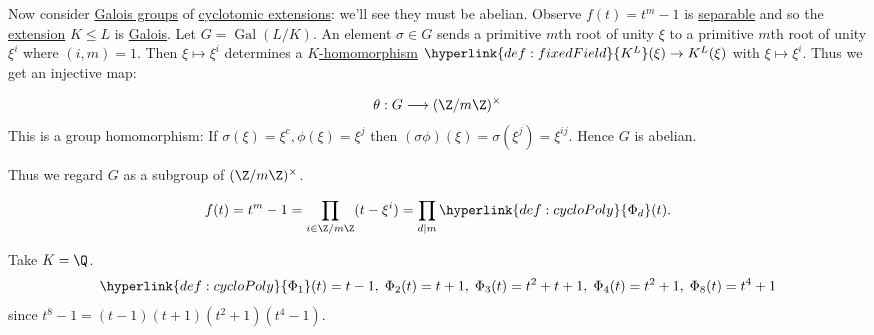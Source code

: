 \documentclass{article}
\DeclareMathOperator{\Gal}{Gal}
\begin{document}
Now consider \hyperlink{def:galoisGroup}{Galois groups} of \hyperlink{def:cycloExt}{cyclotomic extensions}: we'll see they must be abelian.
Observe $f(t) = t^m - 1$ is \hyperlink{def:separablePoly}{separable} and so the \hyperlink{def:fieldExt}{extension} $K \leq L$ is \hyperlink{def:galoisExt}{Galois}.
Let $G = \Gal(L/K)$.
An element $\sigma \in G$ sends a primitive $m$th root of unity $\xi$ to a primitive $m$th root of unity $\xi^i$ where $(i, m) = 1$.
Then $\xi \mapsto \xi^i$ determines a \hyperlink{def:homo}{$K$-homomorphism} $\hyperlink{def:fixedField}{K^L}(\xi) \to K^L(\xi)$ with $\xi \mapsto \xi^i$.
Thus we get an injective map:
\begin{ndef}\label{def:4.3}
    \begin{equation*}
        \theta: G \longrightarrow (\Z/m\Z)^\times
    \end{equation*}
    This is a group homomorphism:
    If $\sigma(\xi) = \xi^c, \phi(\xi) = \xi^j$ then $(\sigma\phi)(\xi) = \sigma(\xi^j) = \xi^{ij}$.
    Hence $G$ is abelian.

    Thus we regard $G$ as a subgroup of $(\Z/m\Z)^\times$.
\end{ndef}


\begin{remark}
    \begin{equation*}f(t) = t^m - 1 = \prod_{i \in \Z/m\Z} (t - \xi^i) = \prod_{d \mid m} \hyperlink{def:cycloPoly}{\Phi_d}(t).\end{equation*}
\end{remark}

\begin{eg}
    Take $K = \Q$.
    \begin{equation*}
        \hyperlink{def:cycloPoly}{\Phi_1}(t) = t-1, \; \Phi_2(t) = t+1, \; \Phi_3(t) = t^2 + t + 1, \; \Phi_4(t) = t^2 + 1, \; \Phi_8(t) = t^4 + 1
    \end{equation*}
    since $t^8-1 = (t-1)(t+1)(t^2 + 1)(t^4 - 1)$.
\end{eg}
\end{document}
